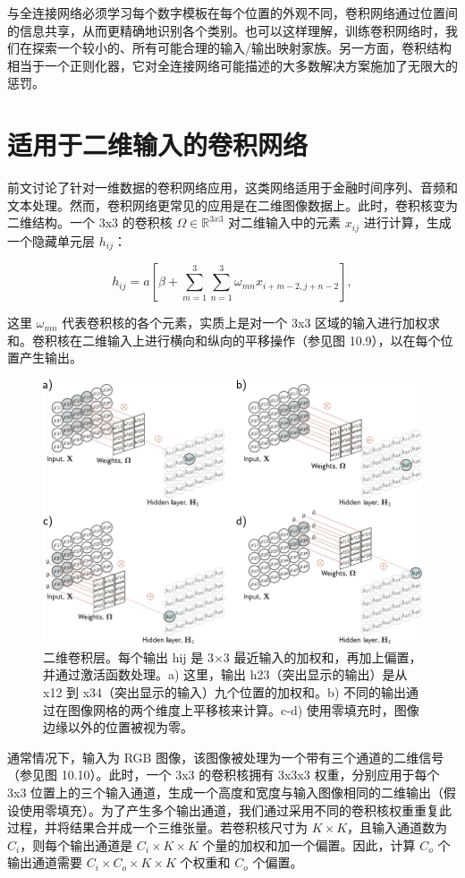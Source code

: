 \documentclass[lang=cn,newtx,10pt,scheme=chinese]{elegantbook}
\begin{document}
与全连接网络必须学习每个数字模板在每个位置的外观不同，卷积网络通过位置间的信息共享，从而更精确地识别各个类别。也可以这样理解，训练卷积网络时，我们在探索一个较小的、所有可能合理的输入/输出映射家族。另一方面，卷积结构相当于一个正则化器，它对全连接网络可能描述的大多数解决方案施加了无限大的惩罚。

\section{适用于二维输入的卷积网络}
前文讨论了针对一维数据的卷积网络应用，这类网络适用于金融时间序列、音频和文本处理。然而，卷积网络更常见的应用是在二维图像数据上。此时，卷积核变为二维结构。一个 3x3 的卷积核 \(\Omega \in \mathbb{R}^{3x3}\) 对二维输入中的元素 \(x_{ij}\) 进行计算，生成一个隐藏单元层 \(h_{ij}\)：

\begin{equation}
h_{ij} = a \left[ \beta + \sum_{m=1}^{3} \sum_{n=1}^{3} \omega_{mn} x_{i+m-2,j+n-2} \right], 
\end{equation}

这里 \(\omega_{mn}\) 代表卷积核的各个元素，实质上是对一个 3x3 区域的输入进行加权求和。卷积核在二维输入上进行横向和纵向的平移操作（参见图 10.9），以在每个位置产生输出。

\begin{figure}[ht!]
	\centering
	\includegraphics[width=0.7\linewidth]{PDFFigures/UDLChap10PDF/Conv2D.pdf}
	\caption{二维卷积层。每个输出 hij 是 3×3 最近输入的加权和，再加上偏置，并通过激活函数处理。a) 这里，输出 h23（突出显示的输出）是从 x12 到 x34（突出显示的输入）九个位置的加权和。b) 不同的输出通过在图像网格的两个维度上平移核来计算。c-d) 使用零填充时，图像边缘以外的位置被视为零。}
\end{figure}


通常情况下，输入为 RGB 图像，该图像被处理为一个带有三个通道的二维信号（参见图 10.10）。此时，一个 3x3 的卷积核拥有 3x3x3 权重，分别应用于每个 3x3 位置上的三个输入通道，生成一个高度和宽度与输入图像相同的二维输出（假设使用零填充）。为了产生多个输出通道，我们通过采用不同的卷积核权重重复此过程，并将结果合并成一个三维张量。若卷积核尺寸为 \(K \times K\)，且输入通道数为 \(C_i\)，则每个输出通道是 \(C_i \times K \times K\) 个量的加权和加一个偏置。因此，计算 \(C_o\) 个输出通道需要 \(C_i \times C_o \times K \times K\) 个权重和 \(C_o\) 个偏置。
\end{document}
